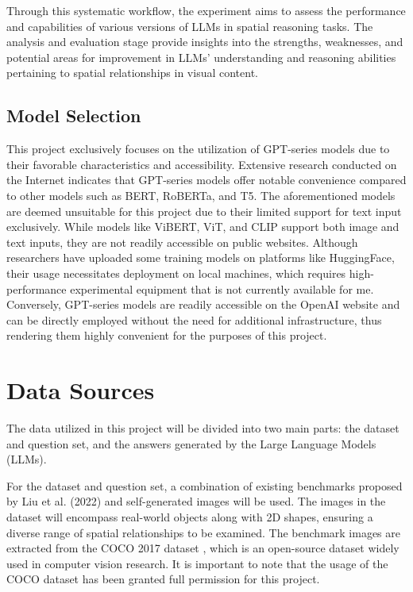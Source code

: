 \documentclass[journal,10pt]{IEEEtran}
\begin{document}
Through this systematic workflow, the experiment aims to assess the performance and capabilities of various versions of LLMs in spatial reasoning tasks. The analysis and evaluation stage provide insights into the strengths, weaknesses, and potential areas for improvement in LLMs' understanding and reasoning abilities pertaining to spatial relationships in visual content.

\subsection{Model Selection}
This project exclusively focuses on the utilization of GPT-series models due to their favorable characteristics and accessibility. Extensive research conducted on the Internet indicates that GPT-series models offer notable convenience compared to other models such as BERT, RoBERTa, and T5. The aforementioned models are deemed unsuitable for this project due to their limited support for text input exclusively. While models like ViBERT, ViT, and CLIP support both image and text inputs, they are not readily accessible on public websites. Although researchers have uploaded some training models on platforms like HuggingFace, their usage necessitates deployment on local machines, which requires high-performance experimental equipment that is not currently available for me. Conversely, GPT-series models are readily accessible on the OpenAI website and can be directly employed without the need for additional infrastructure, thus rendering them highly convenient for the purposes of this project.


\section{Data Sources}
The data utilized in this project will be divided into two main parts: the dataset and question set, and the answers generated by the Large Language Models (LLMs).

For the dataset and question set, a combination of existing benchmarks proposed by Liu et al. (2022) \cite{liu2022visual} and self-generated images will be used. The images in the dataset will encompass real-world objects along with 2D shapes, ensuring a diverse range of spatial relationships to be examined. The benchmark images are extracted from the COCO 2017 dataset \cite{lin2014microsoft}, which is an open-source dataset widely used in computer vision research. It is important to note that the usage of the COCO dataset has been granted full permission for this project.
\end{document}
